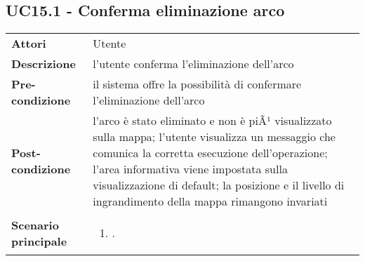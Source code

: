 \subsection{UC15.1 - Conferma eliminazione arco} 
\label{sssec:UC15.1} 
\def\arraystretch{1.5}
\begin{tabularx}{\textwidth}{l|p{}}
	\rowcolor{I} \multicolumn{2}{c}{\color{white}\textbf{UC15.1 - Conferma eliminazione arco}} \\
	\toprule
	\endhead
	\textbf{Attori} & Utente\\
	\textbf{Descrizione} & l'utente conferma l'eliminazione dell'arco\\
	\textbf{Pre-condizione} & il sistema offre la possibilità di confermare l'eliminazione dell'arco\\
	\textbf{Post-condizione} & l'arco è stato eliminato e non è piÃ¹
	visualizzato sulla mappa;  l'utente visualizza un messaggio che comunica la corretta esecuzione dell'operazione; l'area informativa viene impostata sulla visualizzazione di default;  la posizione e il livello di ingrandimento della mappa rimangono invariati\\
	\textbf{Scenario principale} & \vspace{-1.2em}\begin{enumerate}[leftmargin=*,noitemsep,nosep]
		\item \nameref{sssec:UC15.1}.
	\end{enumerate}\\
	\bottomrule
\end{tabularx}
